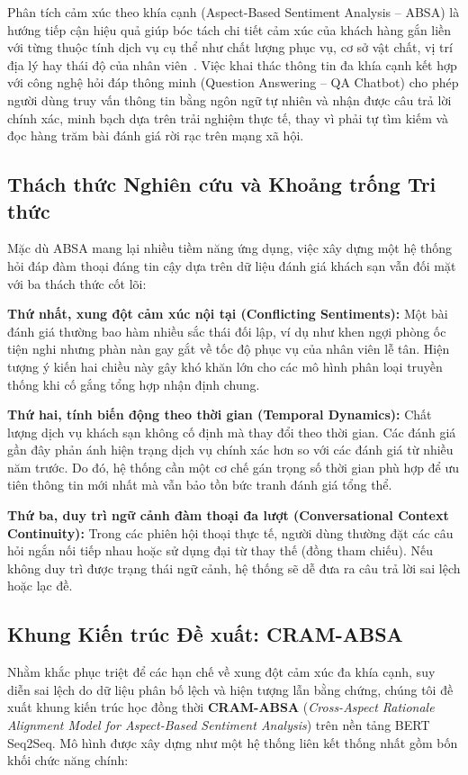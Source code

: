 \documentclass[pdflatex,sn-mathphys-num]{sn-jnl}
\theoremstyle{thmstyleone}
\theoremstyle{thmstyletwo}
\theoremstyle{thmstylethree}
\begin{document}
Phân tích cảm xúc theo khía cạnh (Aspect-Based Sentiment Analysis -- ABSA) là hướng tiếp cận hiệu quả giúp bóc tách chi tiết cảm xúc của khách hàng gắn liền với từng thuộc tính dịch vụ cụ thể như chất lượng phục vụ, cơ sở vật chất, vị trí địa lý hay thái độ của nhân viên~\cite{bimaputra2023aspect}. Việc khai thác thông tin đa khía cạnh kết hợp với công nghệ hỏi đáp thông minh (Question Answering -- QA Chatbot) cho phép người dùng truy vấn thông tin bằng ngôn ngữ tự nhiên và nhận được câu trả lời chính xác, minh bạch dựa trên trải nghiệm thực tế, thay vì phải tự tìm kiếm và đọc hàng trăm bài đánh giá rời rạc trên mạng xã hội.

\subsection{Thách thức Nghiên cứu và Khoảng trống Tri thức}
\label{subsec:problem}
Mặc dù ABSA mang lại nhiều tiềm năng ứng dụng, việc xây dựng một hệ thống hỏi đáp đàm thoại đáng tin cậy dựa trên dữ liệu đánh giá khách sạn vẫn đối mặt với ba thách thức cốt lõi:

\textbf{Thứ nhất, xung đột cảm xúc nội tại (Conflicting Sentiments):} Một bài đánh giá thường bao hàm nhiều sắc thái đối lập, ví dụ như khen ngợi phòng ốc tiện nghi nhưng phàn nàn gay gắt về tốc độ phục vụ của nhân viên lễ tân. Hiện tượng ý kiến hai chiều này gây khó khăn lớn cho các mô hình phân loại truyền thống khi cố gắng tổng hợp nhận định chung.

\textbf{Thứ hai, tính biến động theo thời gian (Temporal Dynamics):} Chất lượng dịch vụ khách sạn không cố định mà thay đổi theo thời gian. Các đánh giá gần đây phản ánh hiện trạng dịch vụ chính xác hơn so với các đánh giá từ nhiều năm trước. Do đó, hệ thống cần một cơ chế gán trọng số thời gian phù hợp để ưu tiên thông tin mới nhất mà vẫn bảo tồn bức tranh đánh giá tổng thể.

\textbf{Thứ ba, duy trì ngữ cảnh đàm thoại đa lượt (Conversational Context Continuity):} Trong các phiên hội thoại thực tế, người dùng thường đặt các câu hỏi ngắn nối tiếp nhau hoặc sử dụng đại từ thay thế (đồng tham chiếu). Nếu không duy trì được trạng thái ngữ cảnh, hệ thống sẽ dễ đưa ra câu trả lời sai lệch hoặc lạc đề.

\subsection{Khung Kiến trúc Đề xuất: CRAM-ABSA}
\label{subsec:proposed_framework}
Nhằm khắc phục triệt để các hạn chế về xung đột cảm xúc đa khía cạnh, suy diễn sai lệch do dữ liệu phân bố lệch và hiện tượng lẫn bằng chứng, chúng tôi đề xuất khung kiến trúc học đồng thời \textbf{CRAM-ABSA} (\textit{Cross-Aspect Rationale Alignment Model for Aspect-Based Sentiment Analysis}) trên nền tảng BERT Seq2Seq. Mô hình được xây dựng như một hệ thống liên kết thống nhất gồm bốn khối chức năng chính:
\end{document}
